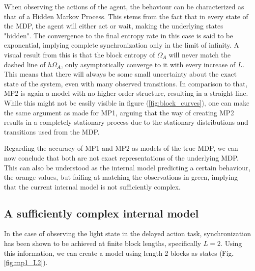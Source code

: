 \documentclass[12pt,a4paper]{article}
\begin{document}
When observing the actions of the agent, the behaviour can be characterized as that of a Hidden Markov Process.
This stems from the fact that in every state of the MDP, the agent will either act or wait, making the underlying states "hidden".
The convergence to the final entropy rate in this case is said to be exponential, implying complete synchronization only in the limit of infinity.
A visual result from this is that the block entropy of $\Omega_A$ will never match the dashed line of $h \Omega_A$, only asymptotically converge to it with every increase of $L$.
This means that there will always be some small uncertainty about the exact state of the system, even with many observed transitions.
In comparison to that, MP2 is again a model with no higher order structure, resulting in a straight line.
While this might not be easily visible in figure (\ref{fig:block_curves}), one can make the same argument as made for MP1, arguing that the way of creating MP2 results in a completely stationary process due to the stationary distributions and transitions used from the MDP.

Regarding the accuracy of MP1 and MP2 as models of the true MDP, we can now conclude that both are not exact representations of the underlying MDP.
This can also be understood as the internal model predicting a certain behaviour, the orange values, but failing at matching the observations in green, implying that the current internal model is not sufficiently complex.

\subsection{A sufficiently complex internal model} \label{ssec:sufficient_internal_model}
In the case of observing the light state in the delayed action task, synchronization has been shown to be achieved at finite block lengths, specifically $L=2$.
Using this information, we can create a model using length 2 blocks as states (Fig. \ref{fig:mp1_L2}).
\end{document}
